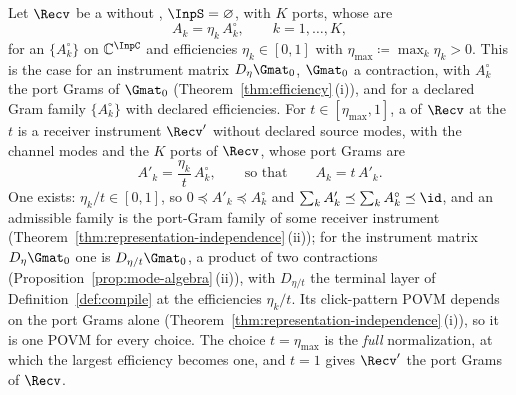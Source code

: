 \begin{definition}\label{def:normalized-station}
Let $\Recv$ be a  without
, $\InpS=\varnothing$, with $K$ ports, whose
 are
\begin{equation}\label{eq:efficiencygrams}
  A_k=\eta_k\,A^{\circ}_k,\qquad k=1,\dots,K,
\end{equation}
for an  $\{A^{\circ}_k\}$ on
$\mathbb{C}^{\InpC}$ and efficiencies $\eta_k\in[0,1]$ with
$\eta_{\max}\coloneqq\max_k\eta_k>0$. This is the case for an instrument
matrix $D_\eta\Gmat_0$, $\Gmat_0$ a contraction, with $A^{\circ}_k$ the port
Grams of $\Gmat_0$ (Theorem~\ref{thm:efficiency}\,(i)), and for a declared
Gram family $\{A^{\circ}_k\}$ with declared efficiencies. For
$t\in[\eta_{\max},1]$, a
of $\Recv$ at the
$t$ is a receiver instrument $\Recv'$ without declared source modes, with the
channel modes and the $K$ ports of $\Recv$, whose port Grams are
\begin{equation}\label{eq:normalizedgrams}
  A'_k=\frac{\eta_k}{t}\,A^{\circ}_k ,\qquad\text{so that}\qquad A_k=t\,A'_k .
\end{equation}
One exists: $\eta_k/t\in[0,1]$, so $0\preceq A'_k\preceq A^{\circ}_k$ and
$\sum_kA'_k\preceq\sum_kA^{\circ}_k\preceq\id$, and an admissible family is
the port-Gram family of some receiver instrument
(Theorem~\ref{thm:representation-independence}\,(ii)); for the instrument
matrix $D_\eta\Gmat_0$ one is $D_{\eta/t}\Gmat_0$, a product of two
contractions (Proposition~\ref{prop:mode-algebra}\,(ii)), with
$D_{\eta/t}$ the terminal layer of Definition~\ref{def:compile} at the
efficiencies $\eta_k/t$. Its click-pattern POVM depends on the port Grams
alone (Theorem~\ref{thm:representation-independence}\,(i)), so it is one
POVM for every choice. The choice $t=\eta_{\max}$ is the \emph{full}
normalization, at which the largest efficiency becomes one, and $t=1$ gives
$\Recv'$ the port Grams of $\Recv$.
\end{definition}
